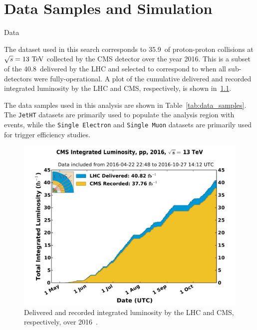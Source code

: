 \chapter{Data Samples and Simulation}
\begin{section}{Data}

The dataset used in this search corresponds to 35.9~\ifb of proton-proton collisions at $\sqrt{s} = 13~\mathrm{Te\kern -0.1em V}$ collected by the CMS detector over the year 2016.
This is a subset of the 40.8~\ifb delivered by the LHC and selected to correspond to when all sub-detectors were fully-operational.
A plot of the cumulative delivered and recorded integrated luminosity by the LHC and CMS, respectively, is shown in~\ref{fig:lumi_2016}. 

The data samples used in this analysis are shown in Table~\ref{tab:data_samples}.
The \texttt{JetHT} datasets are primarily used to populate the analysis region with events, while the \texttt{Single Electron} and \texttt{Single Muon} datasets are primarily used for trigger efficiency studies.

\begin{figure}[tbp!]
\begin{center}
\includegraphics[angle=0,width=0.80\columnwidth]{fig/lumi_2016.pdf}
\end{center}
\caption{Delivered and recorded integrated luminosity by the LHC and CMS, respectively, over 2016~\cite{lumi_2016}.}
\label{fig:lumi_2016}
\end{figure}


\end{section}
